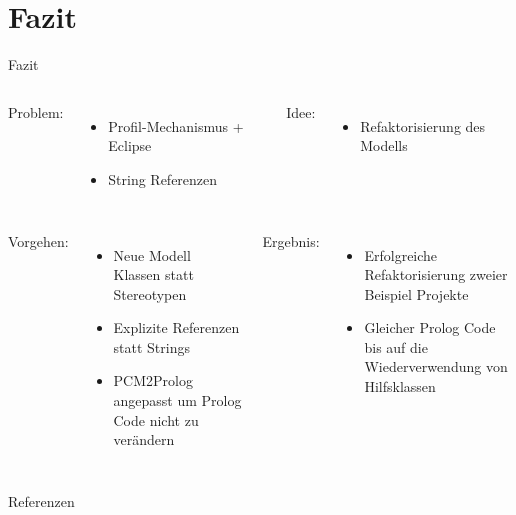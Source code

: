 \documentclass{sdqbeamer}
\begin{document}
\section{Fazit}
\begin{frame}{Fazit}
	\begin{columns}[t]
		Problem:
		\begin{itemize}
			\item Profil-Mechanismus + Eclipse
			\item String Referenzen
		\end{itemize}
		Idee:
			\begin{itemize}
			\item Refaktorisierung des Modells
		\end{itemize}
	\end{columns}
	\vspace{0.05\textheight}
	\begin{columns}[t]
		Vorgehen:
		\begin{itemize}
		\item Neue Modell Klassen statt Stereotypen
		\item Explizite Referenzen statt Strings
		\item PCM2Prolog angepasst um Prolog Code nicht zu verändern
		\end{itemize}
	Ergebnis:
		\begin{itemize}
		\item Erfolgreiche Refaktorisierung zweier Beispiel Projekte
		\item Gleicher Prolog Code bis auf die Wiederverwendung von Hilfsklassen
\end{itemize}
\end{columns}
	
\end{frame}

\begin{frame}{Referenzen}
	\nocite{*}
	\printbibliography
\end{frame}
\appendix
\beginbackup

\backupend
\end{document}
